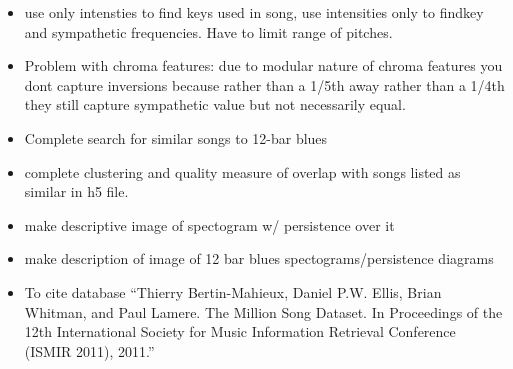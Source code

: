 \documentclass[11pt, a4paper]{article}
\begin{document}
\begin{itemize}
  \item use only intensties to find keys used in song, use intensities only to findkey and sympathetic frequencies. Have to limit range of pitches.
  \item Problem with chroma features: due to modular nature of chroma features you dont capture inversions because rather than a 1/5th away rather than a 1/4th they still capture sympathetic value but not necessarily equal.
  \item Complete search for similar songs to 12-bar blues
  \item complete clustering and quality measure of overlap with songs listed as similar in h5 file.
  \item make descriptive image of spectogram w/ persistence over it
  \item make description of image of 12 bar blues spectograms/persistence diagrams
  \item To cite database ``Thierry Bertin-Mahieux, Daniel P.W. Ellis, Brian Whitman, and Paul Lamere. The Million Song Dataset. In Proceedings of the 12th International Society for Music Information Retrieval Conference (ISMIR 2011), 2011.''
  \end{itemize}
  
\end{document}
